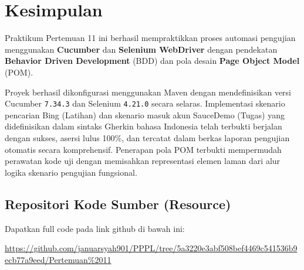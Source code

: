 \documentclass[a4paper,oneside,12pt]{report}
\begin{document}
\chapter{Kesimpulan}
Praktikum Pertemuan 11 ini berhasil mempraktikkan proses automasi pengujian menggunakan \textbf{Cucumber} dan \textbf{Selenium WebDriver} dengan pendekatan \textbf{Behavior Driven Development} (BDD) dan pola desain \textbf{Page Object Model} (POM).

Proyek berhasil dikonfigurasi menggunakan Maven dengan mendefinisikan versi Cucumber \texttt{7.34.3} dan Selenium \texttt{4.21.0} secara selaras. Implementasi skenario pencarian Bing (Latihan) dan skenario masuk akun SauceDemo (Tugas) yang didefinisikan dalam sintaks Gherkin bahasa Indonesia telah terbukti berjalan dengan sukses, asersi lulus 100\%, dan tercatat dalam berkas laporan pengujian otomatis secara komprehensif. Penerapan pola POM terbukti mempermudah perawatan kode uji dengan memisahkan representasi elemen laman dari alur logika skenario pengujian fungsional.

\section{Repositori Kode Sumber (Resource)}
Dapatkan full code pada link github di bawah ini:
\begin{center}
    \url{https://github.com/januarsyah901/PPPL/tree/5a3220e3abf508bef4469c541536b9ecb77a9eed/Pertemuan%2011}
\end{center}
\end{document}
